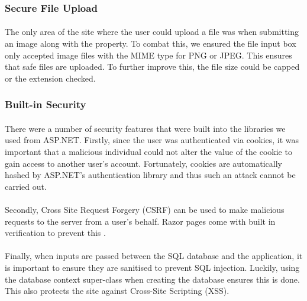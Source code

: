 \documentclass{article}
\begin{document}
        \subsubsection{Secure File Upload}
            \paragraph{}
                The only area of the site where the user could upload a file was when submitting an image along with the property.
                To combat this, we ensured the file input box only accepted image files with the MIME type for PNG or JPEG.
                This ensures that safe files are uploaded.
                To further improve this, the file size could be capped or the extension checked.

        \subsubsection{Built-in Security}
            \paragraph{}
                There were a number of security features that were built into the libraries we used from ASP.NET.
                Firstly, since the user was authenticated via cookies, it was important that a malicious individual could not alter the value of the cookie to gain access to another user’s account.
                Fortunately, cookies are automatically hashed by ASP.NET’s authentication library and thus such an attack cannot be carried out.

            \paragraph{}
                Secondly, Cross Site Request Forgery (CSRF) can be used to make malicious requests to the server from a user’s behalf.
                Razor pages come with built in verification to prevent this \cite{request_verification}.

            \paragraph{}
                Finally, when inputs are passed between the SQL database and the application, it is important to ensure they are sanitised to prevent SQL injection.
                Luckily, using the database context super-class when creating the database ensures this is done.
                This also protects the site against Cross-Site Scripting (XSS).
\end{document}
